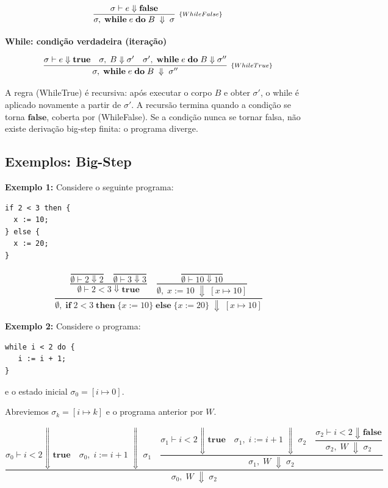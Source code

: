 \[
  \infer[_{\{WhileFalse\}}]{\sigma,\; \mathbf{while}\; e\;
  \mathbf{do}\; B \;\Downarrow\; \sigma}
  {\sigma \vdash e \Downarrow \mathbf{false}}
\]

\textbf{While: condição verdadeira (iteração)}

\[
  \infer[_{\{WhileTrue\}}]{\sigma,\; \mathbf{while}\; e\;
  \mathbf{do}\; B \;\Downarrow\; \sigma''}
  {\sigma \vdash e \Downarrow \mathbf{true}
    &  \sigma,\; B \Downarrow \sigma'
  & \sigma',\; \mathbf{while}\; e\; \mathbf{do}\; B \Downarrow \sigma''}
\]

A regra (WhileTrue) é recursiva: após executar o corpo \(B\) e obter
\(\sigma'\), o while é aplicado novamente a
partir de \(\sigma'\). A recursão termina quando a condição se torna
\(\mathbf{false}\), coberta por (WhileFalse). Se a condição nunca se
tornar falsa, não existe derivação big-step finita: o programa diverge.

\subsection{Exemplos: Big-Step}

\textbf{Exemplo 1:} Considere o seguinte programa:

\begin{verbatim}
if 2 < 3 then {
  x := 10;
} else {
  x := 20;
}
\end{verbatim}

\[
  \dfrac{
    \dfrac{
      \dfrac{}{\emptyset \vdash 2 \Downarrow 2}
      \quad
      \dfrac{}{\emptyset \vdash 3 \Downarrow 3}
    }{\emptyset \vdash 2 < 3 \Downarrow \mathbf{true}}
    \quad
    \dfrac{
      \dfrac{}{\emptyset \vdash 10 \Downarrow 10}
    }{\emptyset,\; x \mathbin{:=} 10 \;\Downarrow\; [x \mapsto 10]}
  }{\emptyset,\; \mathbf{if}\; 2<3\; \mathbf{then}\; \{x \mathbin{:=}
    10\}\; \mathbf{else}\; \{x \mathbin{:=} 20\} \;\Downarrow\; [x
  \mapsto 10]}
\]

\textbf{Exemplo 2:} Considere o programa:

\begin{verbatim}
while i < 2 do {
   i := i + 1;
}
\end{verbatim}
e o estado inicial \(\sigma_0 = [i \mapsto 0]\).

Abreviemos \(\sigma_k = [i \mapsto k]\) e o programa anterior
por \(W\).

\[
  \dfrac{
    \sigma_0 \vdash i < 2 \Downarrow \mathbf{true}
    \quad
    \sigma_0,\; i \mathbin{:=} i+1 \;\Downarrow\; \sigma_1
    \quad
    \dfrac{
      \sigma_1 \vdash i < 2 \Downarrow \mathbf{true}
      \quad
      \sigma_1,\; i \mathbin{:=} i+1 \;\Downarrow\; \sigma_2
      \quad
      \dfrac{
        \sigma_2 \vdash i < 2 \Downarrow \mathbf{false}
      }{\sigma_2,\; W \;\Downarrow\; \sigma_2}
    }{\sigma_1,\; W \;\Downarrow\; \sigma_2}
  }{\sigma_0,\; W \;\Downarrow\; \sigma_2}
\]

